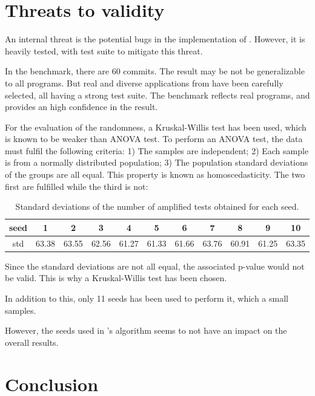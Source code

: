 \section{Threats to validity}
\label{sec:dci:threats}

An internal threat is the potential bugs in the implementation of \DCI.
However, it is heavily tested, with \junit test suite to mitigate this threat.

In the benchmark, there are 60 commits. 
The result may be not be generalizable to all programs. 
But real and diverse applications from \gh have been carefully selected, all having a strong test suite. 
The benchmark reflects real programs, and provides an high confidence in the result.

For the evaluation of the randomness, a Kruskal-Willis test has been used, which is known to be weaker than ANOVA test.
To perform an ANOVA test, the data must fulfil the following criteria:
1) The samples are independent;
2) Each sample is from a normally distributed population;
3) The population standard deviations of the groups are all equal. This property is known as homoscedasticity.
The two first are fulfilled while the third is not:
\begin{table}
\def\arraystretch{1}%
\setlength\tabcolsep{3pt} %
\caption{Standard deviations of the number of amplified tests obtained for each seed.}
\begin{tabular}{c|cccccccccc}
seed     & 1 & 2 & 3 & 4 & 5 & 6 & 7 & 8 & 9 & 10 \\
\hline
std     & 63.38&63.55&62.56&61.27&61.33&61.66&63.76&60.91&61.25&63.35
\end{tabular}
\end{table}
Since the standard deviations are not all equal, the associated p-value would not be valid.
This is why a Kruskal-Willis test has been chosen.

In addition to this, only 11 seeds has been used to perform it, which a small samples.

However, the seeds used in \dspot's algorithm seems to not have an impact on the overall results.

\section{Conclusion}
\label{sec:dci:conclusion}